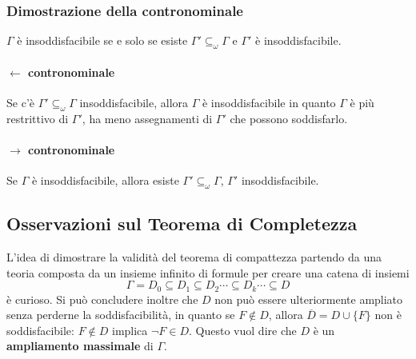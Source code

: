 \subsubsection{Dimostrazione della contronominale}
$\Gamma$ è insoddisfacibile se 
e solo se esiste $\Gamma' \subseteq_{\omega} \Gamma$ e $\Gamma'$ è 
insoddisfacibile. 
\paragraph{$\leftarrow$ contronominale} 
Se c'è $\Gamma' \subseteq_{\omega} \Gamma$ insoddisfacibile, allora $\Gamma$ 
è insoddisfacibile in quanto $\Gamma$ è più restrittivo di $\Gamma'$, ha 
meno assegnamenti di $\Gamma'$ che possono soddisfarlo. 

\paragraph{$\rightarrow$ contronominale}
Se $\Gamma$ è insoddisfacibile, allora esiste $\Gamma' \subseteq_{\omega} \Gamma$, 
$\Gamma'$ insoddisfacibile. 

\subsection{Osservazioni sul Teorema di Completezza}
L'idea di dimostrare la validità del teorema di compattezza partendo 
da una teoria composta da un insieme infinito di formule per creare una catena 
di insiemi 
$$
\Gamma = D_0 \subseteq D_1 \subseteq D_2 \cdots \subseteq D_k \cdots \subseteq D
$$
è curioso. Si può concludere inoltre che $D$ non può essere ulteriormente ampliato 
senza perderne la soddisfacibilità, in quanto se $F \notin D$, allora $\overline{D} = D \cup \{F\}$ 
non è soddisfacibile: $F \notin D$ implica $\neg F \in D$.
Questo vuol dire che $D$ è un \textbf{ampliamento massimale} di $\Gamma$. 

